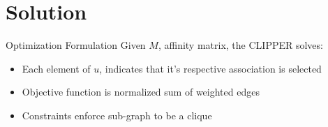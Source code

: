 \documentclass{beamer}
\begin{document}
\section{Solution}
\begin{frame}
  \sectionpage
\end{frame}

\begin{frame}{Optimization Formulation}
  Given $M$, affinity matrix, the CLIPPER solves:


  \begin{itemize}
    \item Each element of $u$, indicates that it's respective association is selected
    \item Objective function is normalized sum of weighted edges
    \item Constraints enforce sub-graph to be a clique
  \end{itemize}
\end{frame}
\end{document}
